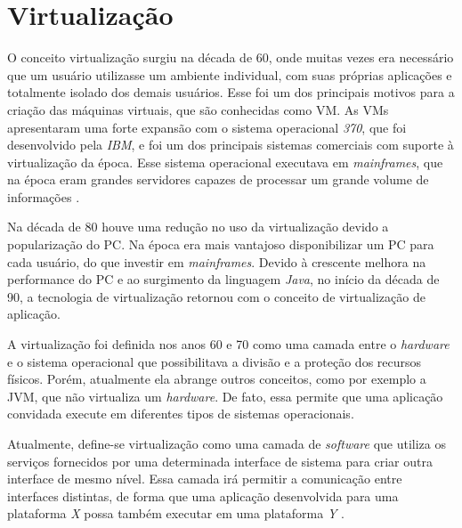 \chapter{Virtualização}
\label{cap:virtualizacao}

O conceito virtualização surgiu na década de 60, onde muitas vezes era necessário que um usuário utilizasse um ambiente individual, 
com suas próprias aplicações e totalmente isolado dos demais usuários. Esse foi um dos principais motivos para a criação das máquinas 
virtuais, que são conhecidas como \ac{VM}. As \ac{VM}s apresentaram uma forte expansão com o sistema operacional \textit{370}, que foi 
desenvolvido pela \textit{IBM}, e foi um dos principais sistemas comerciais com suporte à virtualização da época. Esse sistema operacional 
executava em \textit{mainframes}, que na época eram grandes servidores capazes de processar um grande volume de informações \cite{laureano2008}. 

Na década de 80 houve uma redução no uso da virtualização devido a popularização do \ac{PC}. Na época era mais vantajoso disponibilizar 
um \ac{PC} para cada usuário, do que investir em \textit{mainframes}. Devido à crescente melhora na performance do \ac{PC} e
ao surgimento da linguagem \textit{Java}, no início da década de 90, a tecnologia de virtualização retornou com o conceito de virtualização
de aplicação.

A virtualização foi definida nos anos 60 e 70 como uma camada entre o \textit{hardware} e o sistema operacional que possibilitava a 
divisão e a proteção dos recursos físicos. Porém, atualmente ela abrange outros conceitos, como por exemplo a \ac{JVM}, que não virtualiza
um \textit{hardware}. De fato, essa permite que uma aplicação convidada execute em diferentes tipos de sistemas operacionais.

Atualmente, define-se virtualização como uma camada de \textit{software} que utiliza os serviços fornecidos por uma determinada interface de 
sistema para criar outra interface de mesmo nível. Essa camada irá permitir a comunicação entre interfaces distintas, de forma que uma 
aplicação desenvolvida para uma plataforma \textit{X} possa também executar em uma plataforma \textit{Y} \cite{laureano2008}.

